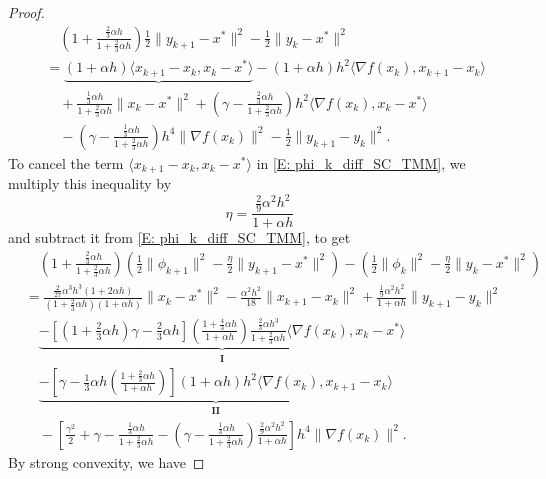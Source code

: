 \documentclass[pdflatex,sn-mathphys-num]{sn-jnl}
\theoremstyle{thmstyleone}
\theoremstyle{thmstyletwo}
\theoremstyle{thmstylethree}
\begin{document}
\begin{appendices}
\begin{proof}
\begin{align*}
&\quad \left( 1 + \frac{\frac{2}{3}\alpha h}{1 + \frac{2}{3}\alpha h} \right)\frac{1}{2}\| y_{k+1}-x^* \|^2 - \frac{1}{2}\| y_k-x^* \|^2 \\
&= \underbrace{ (1+\alpha h)\langle x_{k+1}-x_k, x_k - x^* \rangle }
  - (1+\alpha h)h^2 \langle \nabla f(x_k), x_{k+1}-x_k \rangle \\
&\quad + \frac{\frac{1}{3}\alpha h}{1 + \frac{2}{3}\alpha h}\| x_k - x^* \|^2 
  + \left( \gamma - \frac{\frac{2}{3}\alpha h}{1 + \frac{2}{3}\alpha h} \right) h^2 \langle \nabla f(x_k), x_k - x^* \rangle \\ 
&\quad - \left( \gamma - \frac{\frac{1}{3}\alpha h}{1 + \frac{2}{3}\alpha h} \right) h^4 \| \nabla f(x_k) \|^2 
  - \frac{1}{2}\| y_{k+1} - y_k \|^2.
\end{align*}
To cancel the term $\langle x_{k+1}-x_k, x_k - x^* \rangle$ in \eqref{E: phi_k_diff_SC_TMM}, we multiply this inequality by 
$$ \eta = \frac{\frac{2}{9}\alpha^2 h^2}{1 + \alpha h } $$
and subtract it from \eqref{E: phi_k_diff_SC_TMM}, to get
\begin{align*}
&\quad \left( 1 + \frac{\frac{2}{3}\alpha h}{1 + \frac{2}{3}\alpha h} \right)
  \left( \frac{1}{2}\| \phi_{k+1} \|^2 - \frac{\eta}{2}\| y_{k+1}-x^* \|^2 \right) 
  - \left( \frac{1}{2}\| \phi_k \|^2 - \frac{\eta}{2}\| y_k-x^* \|^2 \right)\\
&= \frac{\frac{2}{27}\alpha^3 h^3 (1+2\alpha h)}{\left( 1+\frac{2}{3}\alpha h \right)(1+\alpha h)}\| x_k - x^* \|^2
  - \frac{\alpha^2 h^2}{18}\| x_{k+1}-x_k \|^2
  + \frac{\frac{1}{9}\alpha^2 h^2}{1 + \alpha h } \| y_{k+1} - y_k \|^2 \\
&\quad \underbrace{ - \left[ \left( 1+\frac{2}{3}\alpha h \right) \gamma - \frac{2}{3}\alpha h \right]\left( \frac{ 1 + \frac{4}{3}\alpha h }{1+\alpha h} \right) \frac{ \frac{2}{3}\alpha h^3 }{1+\frac{2}{3}\alpha h} \langle \nabla f(x_k), x_k-x^* \rangle }_{\mathbf{I}} \\
&\quad \underbrace{ - \left[ \gamma  - \frac{1}{3}\alpha h\left( \frac{1 + \frac{2}{3}\alpha h}{1+\alpha h} \right) \right] ( 1 + \alpha h ) h^2  \langle \nabla f(x_k),x_{k+1}-x_k \rangle }_{\mathbf{II}} \\
&\quad - \left[ \frac{\gamma^2}{2} + \gamma - \frac{ \frac{1}{3}\alpha h }{ 1 + \frac{2}{3}\alpha h } - \left( \gamma - \frac{\frac{1}{3}\alpha h}{1 + \frac{2}{3}\alpha h} \right)\frac{\frac{2}{9}\alpha^2 h^2}{1 + \alpha h } \right] h^4 \| \nabla f(x_k) \|^2.
\end{align*}
By strong convexity, we have

\end{proof}
\end{appendices}
\end{document}
